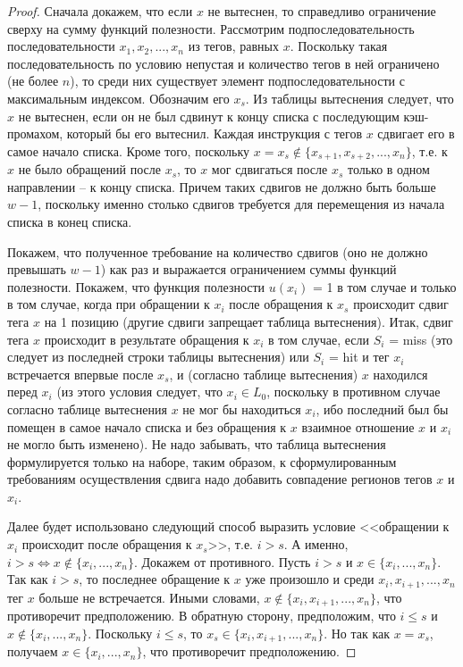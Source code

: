\begin{proof}
  Сначала докажем, что если $x$ не вытеснен, то справедливо ограничение сверху
  на сумму функций полезности. Рассмотрим подпоследовательность
  последовательности $x_1, x_2, ..., x_n$ из тегов, равных $x$.
  Поскольку такая последовательность по условию непустая и
  количество тегов в ней ограничено (не более $n$), то среди них
  существует элемент подпоследовательности с максимальным индексом.
  Обозначим его $x_s$. Из таблицы вытеснения следует, что
  $x$ не вытеснен, если он не был сдвинут к концу списка с
  последующим кэш-промахом, который бы его вытеснил. Каждая инструкция с тегов $x$
  сдвигает его в самое начало списка.
  Кроме того, поскольку $x = x_s \notin \{x_{s+1}, x_{s+2}, ..., x_n\}$, т.е. к
  $x$ не было обращений после $x_s$, то $x$ мог сдвигаться после $x_s$ только в одном
  направлении -- к концу списка. Причем таких сдвигов не должно быть
  больше $w-1$, поскольку именно столько сдвигов требуется для
  перемещения из начала списка в конец списка.

  Покажем, что полученное требование на количество сдвигов (оно не
  должно превышать $w-1$) как раз и выражается ограничением суммы
  функций полезности. Покажем, что функция полезности $u(x_i)$ = 1 в
  том случае и только в том случае, когда при обращении к $x_i$
  после обращения к $x_s$ происходит сдвиг тега $x$ на 1 позицию
  (другие сдвиги запрещает таблица вытеснения). Итак, сдвиг тега $x$
  происходит в результате обращения к $x_i$ в том случае, если $S_i$
  = miss (это следует из последней строки таблицы вытеснения) или
  $S_i$ = hit и тег $x_i$ встречается впервые после $x_s$, и
  (согласно таблице вытеснения) $x$ находился перед $x_i$ (из этого
  условия следует, что $x_i \in L_0$, поскольку в противном случае
  согласно таблице вытеснения $x$ не мог бы находиться $x_i$, ибо
  последний был бы помещен в самое начало списка и без обращения к
  $x$ взаимное отношение $x$ и $x_i$ не могло быть изменено). Не
  надо забывать, что таблица вытеснения формулируется только на
  наборе, таким образом, к сформулированным требованиям
  осуществления сдвига надо добавить совпадение регионов тегов $x$ и
  $x_i$.

  Далее будет использовано следующий способ выразить условие
  <<обращении к $x_i$ происходит после обращения к $x_s$>>, т.е. $i
  > s$. А именно, $i > s \Leftrightarrow x \notin \{x_i, ...,
  x_n\}$. Докажем от противного. Пусть $i > s$ и $x \in \{x_i, ...,
  x_n\}$. Так как $i > s$, то последнее обращение к $x$ уже
  произошло и среди $x_i, x_{i+1}, ..., x_n$ тег $x$ больше не
  встречается. Иными словами, $x \notin \{x_i, x_{i+1}, ..., x_n\}$,
  что противоречит предположению. В обратную сторону, предположим,
  что $i \leqslant s$ и $x \notin \{x_i, ..., x_n\}$. Поскольку $i
  \leqslant s$, то $x_s \in \{x_i, x_{i+1}, ..., x_n\}$. Но так как
  $x = x_s$, получаем $x \in \{x_i, ..., x_n\}$, что противоречит
  предположению.


\end{proof}
